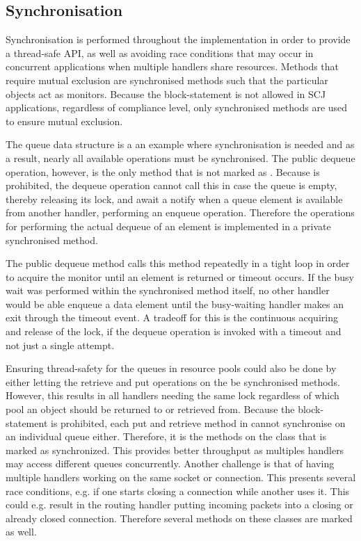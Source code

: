 \subsection{Synchronisation} %
\label{sub:synchronization}
Synchronisation is performed throughout the implementation in order to provide a thread-safe API, as well as avoiding race conditions that may occur in concurrent applications when multiple handlers share resources. Methods that require mutual exclusion are synchronised methods such that the particular objects act as monitors. Because the  block-statement is not allowed in SCJ applications, regardless of compliance level, only synchronised methods are used to ensure mutual exclusion.

The queue data structure is a an example where synchronisation is needed and as a result, nearly all available operations must be synchronised. The public dequeue operation, however, is the only method that is not marked as . Because  is prohibited, the dequeue operation cannot call this in case the queue is empty, thereby releasing its lock, and await a notify when a queue element is available from another handler, performing an enqueue operation. Therefore the operations for performing the actual dequeue of an element is implemented in a private synchronised method. 

The public dequeue method calls this method repeatedly in a tight loop in order to acquire the monitor until an element is returned or timeout occurs. If the busy wait was performed within the synchronised method itself, no other handler would be able enqueue a data element until the busy-waiting handler makes an exit through the timeout event. A tradeoff for this is the continuous acquiring and release of the lock, if the dequeue operation is invoked with a timeout and not just a single attempt.

Ensuring thread-safety for the queues in resource pools could also be done by either letting the retrieve and put operations on the  be synchronised methods. However, this results in all handlers needing the same lock regardless of which pool an object should be returned to or retrieved from. Because the  block-statement is prohibited, each put and retrieve method in  cannot synchronise on an individual queue either. Therefore, it is the methods on the  class that is marked as synchronized. This provides better throughput as multiples handlers may access different queues concurrently. Another challenge is that of having multiple handlers working on the same socket or connection. This presents several race conditions, e.g. if one starts closing a connection while another uses it. This could e.g. result in the routing handler putting incoming packets into a closing or already closed connection. Therefore several methods on these classes are marked  as well.


